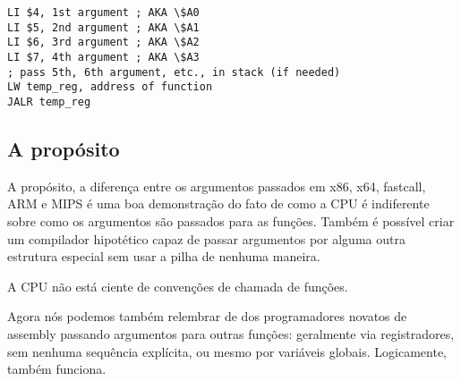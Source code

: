 \begin{lstlisting}[caption=MIPS (O32 calling convention),style=customasmMIPS]
LI $4, 1st argument ; AKA \$A0
LI $5, 2nd argument ; AKA \$A1
LI $6, 3rd argument ; AKA \$A2
LI $7, 4th argument ; AKA \$A3
; pass 5th, 6th argument, etc., in stack (if needed)
LW temp_reg, address of function
JALR temp_reg
\end{lstlisting}

\subsection{A propósito}

A propósito, a diferença entre os argumentos passados em x86, x64, fastcall, ARM e MIPS  é uma boa demonstração do fato de como a CPU é indiferente sobre como os argumentos são passados para as funções.
Também é possível criar um compilador hipotético capaz de passar argumentos por alguma outra estrutura especial sem usar a pilha de nenhuma maneira.

\PTBRph{}

A \ac{CPU} não está ciente de convenções de chamada de funções.

Agora nós podemos também relembrar de dos programadores novatos de assembly passando argumentos para outras funções:
geralmente via registradores, sem nenhuma sequência explícita, ou mesmo por variáveis globais. Logicamente, também funciona.

